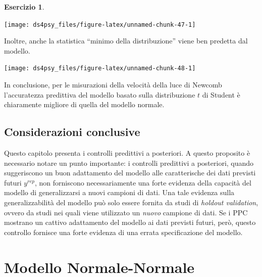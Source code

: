 \documentclass[
  11pt,
]{krantz}
\makeatletter
\newenvironment{Shaded}{\begin{snugshade}}{\end{snugshade}}
\newcommand{\AttributeTok}[1]{\textcolor[rgb]{0.61,0.61,0.61}{#1}}
\newcommand{\FunctionTok}[1]{\textcolor[rgb]{0,0,0}{#1}}
\newcommand{\NormalTok}[1]{#1}
\newcommand{\SpecialCharTok}[1]{\textcolor[rgb]{0,0,0}{#1}}
\newcommand{\StringTok}[1]{\textcolor[rgb]{0.5,0.5,0.5}{#1}}
\newenvironment{kframe}{%
\medskip{}
\setlength{\fboxsep}{.8em}
 \def\at@end@of@kframe{}%
 \ifinner\ifhmode%
  \def\at@end@of@kframe{\end{minipage}}%
  \begin{minipage}{\columnwidth}%
 \fi\fi%
 \def\FrameCommand##1{\hskip\@totalleftmargin \hskip-\fboxsep
 \colorbox{shadecolor}{##1}\hskip-\fboxsep
     \hskip-\linewidth \hskip-\@totalleftmargin \hskip\columnwidth}%
 \MakeFramed {\advance\hsize-\width
   \@totalleftmargin\z@ \linewidth\hsize
   \@setminipage}}%
 {\par\unskip\endMakeFramed%
 \at@end@of@kframe}
\renewenvironment{Shaded}{\begin{kframe}}{\end{kframe}}
\theoremstyle{definition}
\theoremstyle{definition}
\theoremstyle{definition}
\newtheorem{exercise}{Esercizio}[chapter]
\theoremstyle{definition}
\theoremstyle{remark}
\makeatother
\begin{document}
\begin{exercise}
\begin{center}\texttt{[image: ds4psy\_files/figure-latex/unnamed-chunk-47-1]} \end{center}

Inoltre, anche la statistica ``minimo della distribuzione'' viene ben predetta dal modello.

\begin{Shaded}
\end{Shaded}

\begin{center}\texttt{[image: ds4psy\_files/figure-latex/unnamed-chunk-48-1]} \end{center}

In conclusione, per le misurazioni della velocità della luce di Newcomb l'accuratezza predittiva del modello basato sulla distribuzione \(t\) di Student è chiaramente migliore di quella del modello normale.
\end{exercise}

\hypertarget{considerazioni-conclusive-1}{%
\section*{Considerazioni conclusive}\label{considerazioni-conclusive-1}}


Questo capitolo presenta i controlli predittivi a posteriori. A questo proposito è necessario notare un punto importante: i controlli predittivi a posteriori, quando suggeriscono un buon adattamento del modello alle caratterische dei dati previsti futuri \(y^{rep}\), non forniscono necessariamente una forte evidenza della capacità del modello di generalizzarsi a nuovi campioni di dati. Una tale evidenza sulla generalizzabilità del modello può solo essere fornita da studi di \emph{holdout validation}, ovvero da studi nei quali viene utilizzato un \emph{nuovo} campione di dati. Se i PPC mostrano un cattivo adattamento del modello ai dati previsti futuri, però, questo controllo fornisce una forte evidenza di una errata specificazione del modello.

\hypertarget{normal-normal-mod-stan}{%
\chapter{Modello Normale-Normale}\label{normal-normal-mod-stan}}
\end{document}
